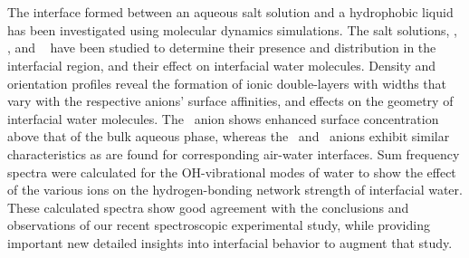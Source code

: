 \section*{}

The interface formed between an aqueous salt solution and a hydrophobic liquid has been investigated using molecular dynamics simulations. The salt solutions, \nacl, \sodnit, and \sodsul~ have been studied to determine their presence and distribution in the interfacial region, and their effect on interfacial water molecules. Density and orientation profiles reveal the formation of ionic double-layers with widths that vary with the respective anions' surface affinities, and effects on the geometry of interfacial water molecules. The \nit~anion shows enhanced surface concentration above that of the bulk aqueous phase, whereas the \cl~and \sul~anions exhibit similar characteristics as are found for corresponding air-water interfaces. Sum frequency spectra were calculated for the OH-vibrational modes of water to show the effect of the various ions on the hydrogen-bonding network strength of interfacial water. These calculated spectra show good agreement with the conclusions and observations of our recent spectroscopic experimental study, while providing important new detailed insights into interfacial behavior to augment that study.

